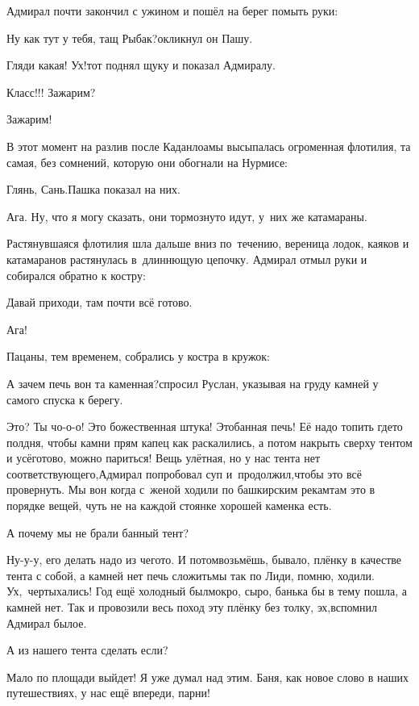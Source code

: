 Адмирал почти закончил с ужином и пошёл на берег помыть руки:

\diagdash Ну как тут у тебя, тащ Рыбак?\mdash окликнул он Пашу.

\diagdash Гляди какая! Ух!\mdash тот поднял щуку и показал Адмиралу.

\diagdash Класс!!! Зажарим?

\diagdash Зажарим!

В этот момент на разлив после Каданлоамы высыпалась огроменная флотилия, та самая, без сомнений, которую они обогнали на Нурмисе:

\diagdash Глянь, Сань.\mdash Пашка показал на них.

\diagdash Ага. Ну, что я могу сказать, они тормознуто идут, у~них же катамараны.

Растянувшаяся флотилия шла дальше вниз по~течению, вереница лодок, каяков и катамаранов растянулась в~длиннющую цепочку. Адмирал отмыл руки и собирался обратно к костру:

\diagdash Давай приходи, там почти всё готово.

\diagdash Ага!

Пацаны, тем временем, собрались у костра в кружок:

\diagdash А зачем печь вон та каменная?\mdash спросил Руслан, указывая на груду камней у самого спуска к берегу.

\diagdash Это? Ты чо-о-о! Это божественная штука! Это\mdash банная печь! Её надо топить где\sdash то полдня, чтобы камни прям капец как раскалились, а потом накрыть сверху тентом и усё\mdash готово, можно париться! Вещь улётная, но у нас тента нет соответствующего,\mdash Адмирал попробовал суп и~продолжил,\mdash чтобы это всё провернуть. Мы вон когда с~женой ходили по башкирским рекам\mdash там это в порядке вещей, чуть не на каждой стоянке хорошей каменка есть.

\diagdash А почему мы не брали банный тент?

\diagdash Ну-у-у, его делать надо из чего\sdash то. И потом\mdash возьмёшь, бывало, плёнку в качестве тента с собой, а камней нет печь сложить\mdash мы так по Лиди, помню, ходили. Ух,~чертыхались! Год ещё холодный был\mdash мокро, сыро, банька бы в тему пошла, а камней нет. Так и провозили весь поход эту плёнку без толку, эх,\mdash вспомнил Адмирал былое.

\diagdash А из нашего тента сделать если?

\diagdash Мало по площади выйдет! Я уже думал над этим. Баня, как новое слово в наших путешествиях, у нас ещё впереди, парни!

